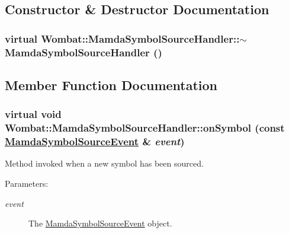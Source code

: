 \subsection{Constructor \& Destructor Documentation}
\hypertarget{classWombat_1_1MamdaSymbolSourceHandler_1725b2e33b959e1c7c1938726d244b5e}{
\subsubsection[$\sim$MamdaSymbolSourceHandler]{\setlength{\rightskip}{0pt plus 5cm}virtual Wombat::Mamda\-Symbol\-Source\-Handler::$\sim$Mamda\-Symbol\-Source\-Handler ()}}
\label{classWombat_1_1MamdaSymbolSourceHandler_1725b2e33b959e1c7c1938726d244b5e}




\subsection{Member Function Documentation}
\hypertarget{classWombat_1_1MamdaSymbolSourceHandler_228ac54d0c2631e57612efbfa2701128}{
\subsubsection[onSymbol]{\setlength{\rightskip}{0pt plus 5cm}virtual void Wombat::Mamda\-Symbol\-Source\-Handler::on\-Symbol (const \hyperlink{classWombat_1_1MamdaSymbolSourceEvent}{Mamda\-Symbol\-Source\-Event} \& {\em event})}}
\label{classWombat_1_1MamdaSymbolSourceHandler_228ac54d0c2631e57612efbfa2701128}


Method invoked when a new symbol has been sourced. 

\begin{Desc}
\item[Parameters:]
\begin{description}
\item[{\em event}]The \hyperlink{classWombat_1_1MamdaSymbolSourceEvent}{Mamda\-Symbol\-Source\-Event} object. \end{description}
\end{Desc}
